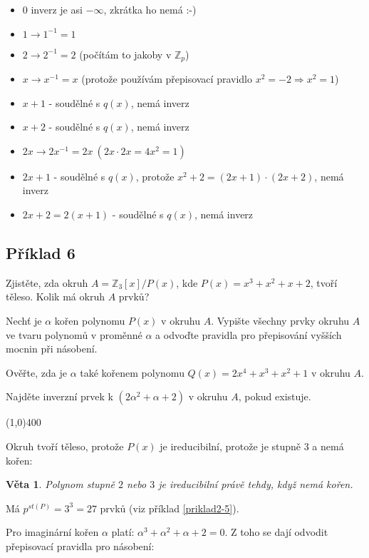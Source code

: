 \documentclass{article}
\newtheorem{veta}{Věta}[section]
\begin{document}
\begin{itemize}
	\item $0$ inverz je asi $-\infty$, zkrátka ho nemá :-)
	\item $1 \rightarrow 1^{-1} = 1$
	\item $2 \rightarrow 2^{-1} = 2$ (počítám to jakoby v $\mathbb{Z}_p$)
	\item $x \rightarrow x^{-1} = x$ (protože používám přepisovací pravidlo $x^2 = -2 \Rightarrow x^2 = 1$)
	\item $x+1$ - soudělné s $q(x)$, nemá inverz
	\item $x+2$ - soudělné s $q(x)$, nemá inverz
	\item $2x \rightarrow 2x^{-1} = 2x\ (2x\cdot2x = 4x^2 = 1)$ 
	\item $2x+1$ - soudělné s $q(x)$, protože $x^2 + 2 = (2x+1)\cdot(2x+2)$, nemá inverz  
	\item $2x+2 = 2(x+1)$ - soudělné s $q(x)$, nemá inverz
\end{itemize} 

\subsection{Příklad 6}
Zjistěte, zda okruh $A = \mathbb{Z}_3[x]/P(x)$, kde $P(x) = x^3 + x^2 + x + 2$, tvoří těleso. Kolik má okruh $A$ prvků?

Nechť je $\alpha$ kořen polynomu $P(x)$ v okruhu $A$. Vypište všechny prvky okruhu $A$ ve tvaru polynomů v proměnné $\alpha$ a odvoďte pravidla pro přepisování vyšších mocnin při násobení.

Ověřte, zda je $\alpha$ také kořenem polynomu $Q(x) = 2x^4 + x^3 + x^2 + 1$ v okruhu $A$.

Najděte inverzní prvek k $(2\alpha^2 + \alpha + 2)$ v okruhu $A$, pokud existuje. 

\line(1,0){400}

Okruh tvoří těleso, protože $P(x)$ je ireducibilní, protože je stupně $3$ a nemá kořen:

\begin{veta}
Polynom stupně $2$ nebo $3$ je ireducibilní právě tehdy, když nemá kořen.
\end{veta}

Má $p^{st(P)} = 3^3 = 27$ prvků (viz příklad \ref{priklad2-5}).  

Pro imaginární kořen $\alpha$ platí: $\alpha^3 + \alpha^2 + \alpha + 2 = 0$. Z toho se dají odvodit přepisovací pravidla pro násobení:  
\end{document}
